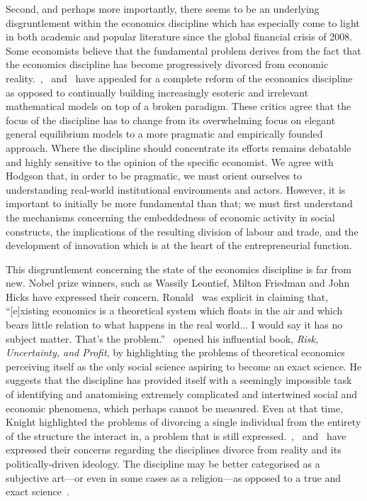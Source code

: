 Second, and perhaps more importantly, there seems to be an underlying disgruntlement within the economics discipline which has especially come to light in both academic and popular literature since the global financial crisis of 2008. Some economists believe that the fundamental problem derives from the fact that the economics discipline has become progressively divorced from economic reality.~\citet{Hodgson2009},~\citet{Smith2010} and~\citet{Keen2011} have appealed for a complete reform of the economics discipline as opposed to continually building increasingly esoteric and irrelevant mathematical models on top of a broken paradigm. These critics agree that the focus of the discipline has to change from its overwhelming focus on elegant general equilibrium models to a more pragmatic and empirically founded approach. Where the discipline should concentrate its efforts remains debatable and highly sensitive to the opinion of the specific economist. We agree with Hodgson that, in order to be pragmatic, we must orient ourselves to understanding real-world institutional environments and actors. However, it is important to initially be more fundamental than that; we must first understand the mechanisms concerning the embeddedness of economic activity in social constructs, the implications of the resulting division of labour and trade, and the development of innovation which is at the heart of the entrepreneurial function.

This disgruntlement concerning the state of the economics discipline is far from new. Nobel prize winners, such as Wassily Leontief, Milton Friedman and John Hicks have expressed their concern. Ronald~\citet{Coase1997} was explicit in claiming that, ``[e]xisting economics is a theoretical system which floats in the air and which bears little relation to what happens in the real world... I would say it has no subject matter. That's the problem.''~\citet{Knight1921} opened his influential book, \textit{Risk, Uncertainty, and Profit}, by highlighting the problems of theoretical economics perceiving itself as the only social science aspiring to become an exact science. He suggests that the discipline has provided itself with a seemingly impossible task of identifying and anatomising extremely complicated and intertwined social and economic phenomena, which perhaps cannot be measured. Even at that time, Knight highlighted the problems of divorcing a single individual from the entirety of the structure the interact in, a problem that is still expressed.~\citet{Krugman2009},~\citet{Stiglitz2010} and~\citet{Varoufakis2011} have expressed their concerns regarding the disciplines divorce from reality and its politically-driven ideology. The discipline may be better categorised as a subjective art---or even in some cases as a religion---as opposed to a true and exact science~\citep{Backhouse2010}.

